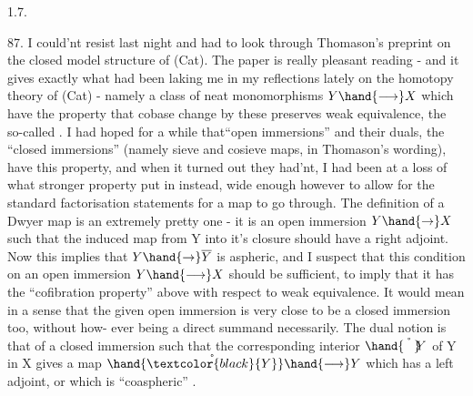 
1.7.

87.    I could'nt resist last night and had to look through Thomason's
preprint on the closed model structure of (Cat).  The paper is  really
pleasant reading  -  and it gives exactly what had been laking me in my
reflections lately on the homotopy theory of (Cat)  -  namely a class of
neat monomorphisms  $Y\hand{\longrightarrow}X$  which  have the property that cobase change
by these preserves weak equivalence,  the so-called \hand{\uline{\textcolor{black}{Dwyer}}} \hand{\uline{\textcolor{black}{maps}}}.  I had
hoped for a while that``open immersions''  and their duals,  the ``closed
immersions''  (namely sieve and cosieve maps,  in Thomason's wording), have
this property,  and when it turned out they had'nt,  I had been at a loss
of what stronger property put in instead,  wide enough however to allow
for the standard factorisation statements for a map to go through.  The
definition of a Dwyer map is an extremely pretty one  -  it is an open
immersion $Y\hand{\to}X$  such that the induced map from Y into it's closure 
should have a right adjoint.  Now this implies that $Y\hand{\to}\overline{Y}$  is aspheric,
and I suspect that this  condition on an open immersion $Y\hand{\longrightarrow}X$ should be
sufficient,  to imply that it has the ``cofibration property'' above with
respect to weak equivalence.  It would mean in a sense that the given
open immersion is very close to be a closed immersion too,  without how-%
ever being a direct summand necessarily.  The dual notion  is that of a
closed immersion such that the corresponding interior  $\hand{\mathring{\phantom{Y}}}\!\!Y$  of Y in X gives
a map  $\hand{\mathring{\textcolor{black}{Y}}}\hand{\longrightarrow}Y$  which has a left adjoint,  or  which is ``coaspheric'' .
